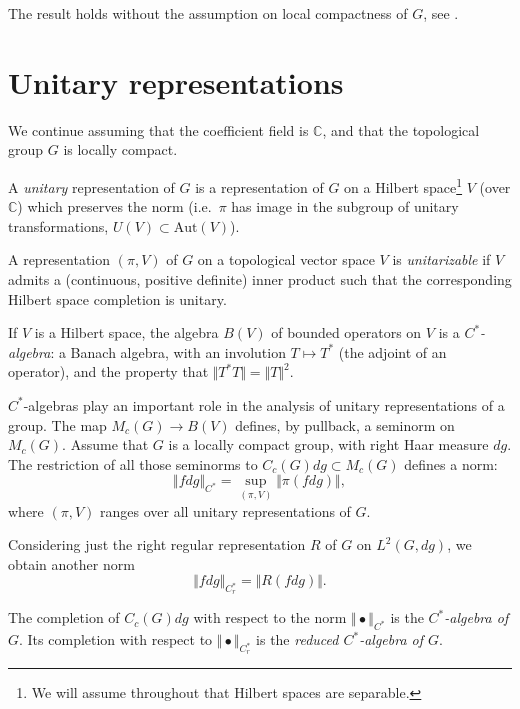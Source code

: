 \begin{remark}
 The result holds without the assumption on local compactness of $G$, see \cite[Corollary 6.9]{Megrelishvili}.
\end{remark}




\section{Unitary representations}
\label{section-unitary-representations}

We continue assuming that the coefficient field is $\mathbb C$, and that the topological group $G$ is locally compact.


\begin{definition}
\label{definition-unitary-representation}
A {\it unitary} representation of $G$ is a representation of $G$ on a Hilbert space\footnote{We will assume throughout that Hilbert spaces are separable.} $V$ (over $\mathbb C$) which preserves the norm (i.e.\ $\pi$ has image in the subgroup of unitary transformations, $U(V)\subset \text{Aut}(V)$). 

A representation $(\pi,V)$ of $G$ on a topological vector space $V$ is {\it unitarizable} if $V$ admits a (continuous, positive definite) inner product such that the corresponding Hilbert space completion is unitary.
\end{definition}

If $V$ is a Hilbert space, the algebra $B(V)$ of bounded operators on $V$ is a {\it $C^*$-algebra}: a Banach algebra, with an involution $T\mapsto T^*$ (the adjoint of an operator), and the property that $\Vert T^*T\Vert = \Vert T\Vert^2$.

$C^*$-algebras play an important role in the analysis of unitary representations of a group. 
The map $M_c(G)\to B(V)$ defines, by pullback, a seminorm on $M_c(G)$. Assume that $G$ is a locally compact group, with right Haar measure $dg$. The restriction of all those seminorms to $C_c(G)dg\subset M_c(G)$ defines a norm:
$$ \Vert fdg \Vert_{C^*} = \sup_{(\pi,V)} \Vert \pi(fdg)\Vert,$$
where $(\pi,V)$ ranges over all unitary representations of $G$. 

Considering just the right regular representation $R$ of $G$ on $L^2(G,dg)$, we obtain another norm
$$ \Vert fdg \Vert_{C_r^*} = \Vert R(fdg)\Vert.$$

\begin{definition}
\label{definition-Cstar}
The completion of $C_c(G) dg$ with respect to the norm $\Vert\bullet\Vert_{C^*}$ is the {\it $C^*$-algebra of $G$}. Its completion with respect to $\Vert\bullet \Vert_{C_r^*}$ is the {\it reduced $C^*$-algebra of $G$}.
\end{definition}

